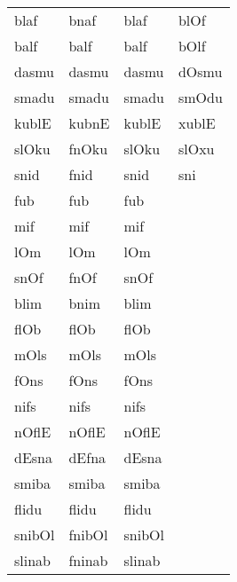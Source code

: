 \begin{appendix}
\begin{table}[!h]
\begin{tabular}{llll}
blaf & bnaf & blaf & blOf\\
balf & balf & balf & bOlf\\
dasmu & dasmu & dasmu & dOsmu\\
smadu & smadu & smadu & smOdu\\
kublE & kubnE & kublE & xublE\\
slOku & fnOku & slOku & slOxu\\
snid & fnid & snid & sni\\
fub & fub & fub & \\
mif & mif & mif & \\
lOm & lOm & lOm & \\
snOf & fnOf & snOf & \\
blim & bnim & blim & \\
flOb & flOb & flOb & \\
mOls & mOls & mOls & \\
fOns & fOns & fOns & \\
nifs & nifs & nifs & \\
nOflE & nOflE & nOflE & \\
dEsna & dEfna & dEsna & \\
smiba & smiba & smiba & \\
flidu & flidu & flidu & \\
snibOl & fnibOl & snibOl & \\
slinab & fninab & slinab & \\
\bottomrule
\end{tabular}
\end{table}
\end{appendix}
